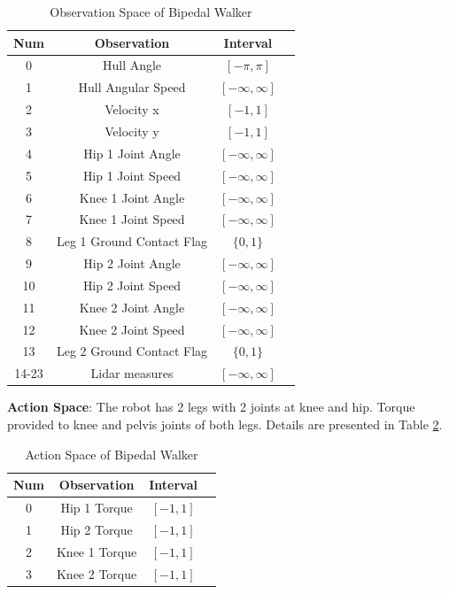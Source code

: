 \begin{table}[h!]
	\begin{center}
	\begin{tabular}{cccc}
		\textbf{Num} & \textbf{Observation} & \textbf{Interval} \\
		\hline 
		0  & Hull Angle & $[-\pi,\pi]$ \\
		1  & Hull Angular Speed & $[-\infty,\infty]$ \\
		2  & Velocity x & $[-1,1]$ \\
		3  & Velocity y &$[-1,1]$ \\
		4  & Hip 1 Joint Angle & $[-\infty,\infty]$ \\
		5  & Hip 1 Joint Speed & $[-\infty,\infty]$ \\
		6  & Knee 1 Joint Angle & $[-\infty,\infty]$ \\
		7  & Knee 1 Joint Speed & $[-\infty,\infty]$ \\
		8  & Leg 1 Ground Contact Flag & $\{0,1\}$ \\
		9  & Hip 2 Joint Angle & $[-\infty,\infty]$ \\
		10  & Hip 2 Joint Speed & $[-\infty,\infty]$ \\
		11  & Knee 2 Joint Angle & $[-\infty,\infty]$ \\
		12  & Knee 2 Joint Speed & $[-\infty,\infty]$ \\
		13  & Leg 2 Ground Contact Flag & $\{0,1\}$ \\
		14-23  & Lidar measures  & $[-\infty,\infty]$
	\end{tabular}
	\end{center}
	\caption{Observation Space of Bipedal Walker}
	\label{table:bpw_obs_space}
\end{table}

\textbf{Action Space}: The robot has 2 legs with 2 joints at knee and hip. Torque provided to knee and pelvis joints of both legs. Details are presented in Table \ref{table:bpw_act_space}.

\begin{table}[h!]
	\begin{center}
		\begin{tabular}{cccc}
			\textbf{Num} & \textbf{Observation} & \textbf{Interval} \\
			\hline
			0  & Hip 1 Torque & $[-1,1]$ \\
			1  & Hip 2 Torque & $[-1,1]$ \\
			2  & Knee 1 Torque & $[-1,1]$ \\
			3  & Knee 2 Torque & $[-1,1]$ \\
		\end{tabular}
	\end{center}
	\caption{Action Space of Bipedal Walker}
	\label{table:bpw_act_space}
\end{table}

